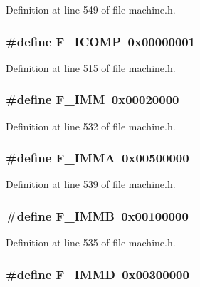 Definition at line 549 of file machine.h.
\subsubsection[{F\_\-ICOMP}]{\setlength{\rightskip}{0pt plus 5cm}\#define F\_\-ICOMP~0x00000001}\label{machine_8h_f20298accfdd3e509f09850a88989b7c}




Definition at line 515 of file machine.h.
\subsubsection[{F\_\-IMM}]{\setlength{\rightskip}{0pt plus 5cm}\#define F\_\-IMM~0x00020000}\label{machine_8h_09a630c7ecb9d50dae4b42229184e00d}




Definition at line 532 of file machine.h.
\subsubsection[{F\_\-IMMA}]{\setlength{\rightskip}{0pt plus 5cm}\#define F\_\-IMMA~0x00500000}\label{machine_8h_508339853c38720131f96e6f2169c3bd}




Definition at line 539 of file machine.h.
\subsubsection[{F\_\-IMMB}]{\setlength{\rightskip}{0pt plus 5cm}\#define F\_\-IMMB~0x00100000}\label{machine_8h_c6ac63e2d699cda8b41cfc1991c69294}




Definition at line 535 of file machine.h.
\subsubsection[{F\_\-IMMD}]{\setlength{\rightskip}{0pt plus 5cm}\#define F\_\-IMMD~0x00300000}\label{machine_8h_ededbdffd8af3783b8a5b23e5ea64f84}




